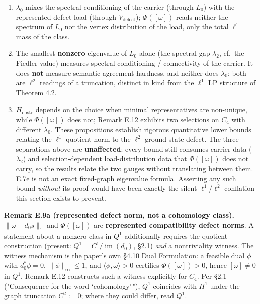 \documentclass[
]{article}
\providecommand{\tightlist}{%
  \setlength{\itemsep}{0pt}\setlength{\parskip}{0pt}}
\providecommand{\tightlist}{%
  \setlength{\itemsep}{0pt}\setlength{\parskip}{0pt}}
\begin{document}
\begin{enumerate}
\def\labelenumi{\arabic{enumi}.}
\tightlist
\item
  \(\lambda_0\) mixes the spectral conditioning of the carrier (through \(L_0\)) with the represented defect load (through \(V_{\mathrm{defect}}\)); \(\Phi([\omega])\) reads neither the spectrum of \(L_0\) nor the vertex distribution of the load, only the total \(\ell^1\) mass of the class.
\item
  The smallest \textbf{nonzero} eigenvalue of \(L_0\) alone (the spectral gap \(\lambda_2\), cf.~the Fiedler value) measures spectral conditioning / connectivity of the carrier. It does \textbf{not} measure semantic agreement hardness, and neither does \(\lambda_0\); both are \(\ell^2\) readings of a truncation, distinct in kind from the \(\ell^1\) LP structure of Theorem 4.2.
\item
  \(H_{\mathrm{obstr}}\) depends on the choice when minimal representatives are non-unique, while \(\Phi([\omega])\) does not; Remark E.12 exhibits two selections on \(C_4\) with different \(\lambda_0\).
  These propositions establish rigorous quantitative lower bounds relating the \(\ell^1\) quotient norm to the \(\ell^2\) ground-state defect. The three separations above are \textbf{unaffected}: every bound still consumes carrier data (\(\lambda_2\)) and selection-dependent load-distribution data that \(\Phi([\omega])\) does not carry, so the results relate the two gauges without translating between them. E.7e is not an exact fixed-graph eigenvalue formula. Asserting any such bound \emph{without} its proof would have been exactly the silent \(\ell^1\)/\(\ell^2\) conflation this section exists to prevent.
\end{enumerate}

\textbf{Remark E.9a (represented defect norm, not a cohomology class).} \(\|\omega - d_0 s\|_1\) and \(\Phi([\omega])\) are \textbf{represented compatibility defect norms}. A statement about a nonzero class in \(Q^1\) additionally requires the quotient construction (present: \(Q^1 = C^1/\operatorname{im}(d_0)\), §2.1) \emph{and} a nontriviality witness. The witness mechanism is the paper's own §4.10 Dual Formulation: a feasible dual \(\phi\) with \(d_0^*\phi = 0\), \(\|\phi\|_\infty \le 1\), and \(\langle \phi, \omega \rangle > 0\) certifies \(\Phi([\omega]) > 0\), hence \([\omega] \neq 0\) in \(Q^1\). Remark E.12 constructs such a witness explicitly for \(C_4\). Per §2.1 ("Consequence for the word `cohomology'\,"), \(Q^1\) coincides with \(H^1\) under the graph truncation \(C^2 := 0\); where they could differ, read \(Q^1\).
\end{document}
